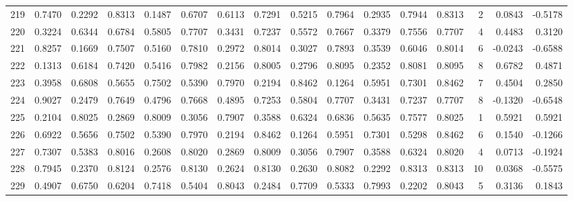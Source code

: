 \begin{tabular}{lrrrrrrrrrrrrrrr}
219 &      0.7470 &  0.2292 &  0.8313 &  0.1487 &  0.6707 &  0.6113 &  0.7291 &  0.5215 &  0.7964 &  0.2935 &   0.7944 &     0.8313 &      2 &                    0.0843 &                    -0.5178 \\
220 &      0.3224 &  0.6344 &  0.6784 &  0.5805 &  0.7707 &  0.3431 &  0.7237 &  0.5572 &  0.7667 &  0.3379 &   0.7556 &     0.7707 &      4 &                    0.4483 &                     0.3120 \\
221 &      0.8257 &  0.1669 &  0.7507 &  0.5160 &  0.7810 &  0.2972 &  0.8014 &  0.3027 &  0.7893 &  0.3539 &   0.6046 &     0.8014 &      6 &                   -0.0243 &                    -0.6588 \\
222 &      0.1313 &  0.6184 &  0.7420 &  0.5416 &  0.7982 &  0.2156 &  0.8005 &  0.2796 &  0.8095 &  0.2352 &   0.8081 &     0.8095 &      8 &                    0.6782 &                     0.4871 \\
223 &      0.3958 &  0.6808 &  0.5655 &  0.7502 &  0.5390 &  0.7970 &  0.2194 &  0.8462 &  0.1264 &  0.5951 &   0.7301 &     0.8462 &      7 &                    0.4504 &                     0.2850 \\
224 &      0.9027 &  0.2479 &  0.7649 &  0.4796 &  0.7668 &  0.4895 &  0.7253 &  0.5804 &  0.7707 &  0.3431 &   0.7237 &     0.7707 &      8 &                   -0.1320 &                    -0.6548 \\
225 &      0.2104 &  0.8025 &  0.2869 &  0.8009 &  0.3056 &  0.7907 &  0.3588 &  0.6324 &  0.6836 &  0.5635 &   0.7577 &     0.8025 &      1 &                    0.5921 &                     0.5921 \\
226 &      0.6922 &  0.5656 &  0.7502 &  0.5390 &  0.7970 &  0.2194 &  0.8462 &  0.1264 &  0.5951 &  0.7301 &   0.5298 &     0.8462 &      6 &                    0.1540 &                    -0.1266 \\
227 &      0.7307 &  0.5383 &  0.8016 &  0.2608 &  0.8020 &  0.2869 &  0.8009 &  0.3056 &  0.7907 &  0.3588 &   0.6324 &     0.8020 &      4 &                    0.0713 &                    -0.1924 \\
228 &      0.7945 &  0.2370 &  0.8124 &  0.2576 &  0.8130 &  0.2624 &  0.8130 &  0.2630 &  0.8082 &  0.2292 &   0.8313 &     0.8313 &     10 &                    0.0368 &                    -0.5575 \\
229 &      0.4907 &  0.6750 &  0.6204 &  0.7418 &  0.5404 &  0.8043 &  0.2484 &  0.7709 &  0.5333 &  0.7993 &   0.2202 &     0.8043 &      5 &                    0.3136 &                     0.1843 \\

\end{tabular}
